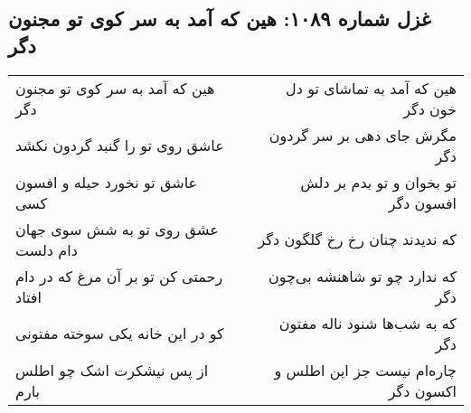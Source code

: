 \begin{center}
\section*{غزل شماره ۱۰۸۹: هین که آمد به سر کوی تو مجنون دگر}
\label{sec:1089}
\begin{longtable}{l p{0.5cm} r}
هین که آمد به سر کوی تو مجنون دگر
&&
هین که آمد به تماشای تو دل خون دگر
\\
عاشق روی تو را گنبد گردون نکشد
&&
مگرش جای دهی بر سر گردون دگر
\\
عاشق تو نخورد حیله و افسون کسی
&&
تو بخوان و تو بدم بر دلش افسون دگر
\\
عشق روی تو به شش سوی جهان دام دلست
&&
که ندیدند چنان رخ رخ گلگون دگر
\\
رحمتی کن تو بر آن مرغ که در دام افتاد
&&
که ندارد چو تو شاهنشه بی‌چون دگر
\\
کو در این خانه یکی سوخته مفتونی
&&
که به شب‌ها شنود ناله مفتون دگر
\\
از پس نیشکرت اشک چو اطلس بارم
&&
چاره‌ام نیست جز این اطلس و اکسون دگر
\\
\end{longtable}
\end{center}
